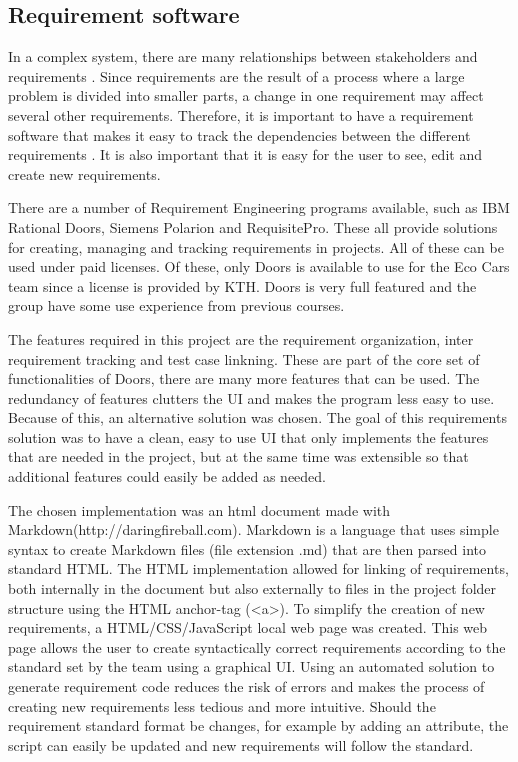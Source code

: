 \subsection{Requirement software}
In a complex system, there are many relationships between stakeholders and
requirements \cite{ibm_req}. Since requirements are the result of a process
where a large problem is divided into smaller parts, a change in one requirement
may affect several other requirements. Therefore, it is important to have a
requirement software that makes it easy to track the dependencies between the
different requirements \cite{ibm_req}. It is also important that it is easy for
the user to see, edit and create new requirements.

There are a number of Requirement Engineering programs available, such as IBM
Rational Doors, Siemens Polarion and RequisitePro. These all provide solutions
for creating, managing and tracking requirements in projects. All of these can
be used under paid licenses. Of these, only Doors is available to use for the
Eco Cars team since a license is provided by KTH. Doors is very full featured
and the group have some use experience from previous courses. 

The features required in this project are the requirement organization, inter
requirement tracking and test case linkning. These are part of the core set of
functionalities of Doors, there are many more features that can be used. The
redundancy of features clutters the UI and makes the program less easy to use.
Because of this, an alternative solution was chosen. The goal of this
requirements solution was to have a clean, easy to use UI that only implements
the features that are needed in the project, but at the same time was
extensible so that additional features could easily be added as needed.

The chosen implementation was an html document made with
Markdown(http://daringfireball.com). Markdown is a language that uses simple
syntax to create Markdown files (file extension .md) that are then parsed
into standard HTML. The HTML implementation allowed for linking of requirements,
both internally in the document but also externally to files in the project
folder structure using the HTML anchor-tag (<a>). To simplify the creation of
new requirements, a HTML/CSS/JavaScript local web page was created. This web
page allows the user to create syntactically correct requirements according to
the standard set by the team using a graphical UI. Using an automated solution
to generate requirement code reduces the risk of errors and makes the process of
creating new requirements less tedious and more intuitive. Should the
requirement standard format be changes, for example by adding an attribute, the
script can easily be updated and new requirements will follow the standard.

